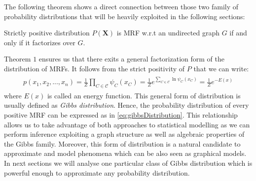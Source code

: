\documentclass[../report/report.tex]{subfiles}
\begin{document}
The following theorem shows a direct connection between those two family of probability distributions that will be heavily exploited in the following sections:
\begin{theorem}  Strictly positive distribution $P(\mathbf{X})$ is MRF  w.r.t an undirected graph $G$ if and only if it factorizes over $G$.
\end{theorem}
Theorem $1$ ensures us that there exits a general factorization form of the distribution of MRFs. It follows from the strict positivity of $P$ that we can write:
\begin{align}
\begin{split}
p(x_1, x_2, ..., x_n) = \frac{1}{Z} \prod_{C \in \mathcal{C}} \psi
_C(x_C) = \frac{1}{Z} e ^{\sum_{C \in \mathcal{C}} \ln \psi
_C(x_C) } = \frac{1}{Z} e ^{-E(x)}
\end{split}
\label{eq:gibbsDistribution}
\end{align}
where $E(x)$ is called an energy function. This general form of distribution is usually defined as \emph{Gibbs distribution}. Hence, the probability distribution of every positive MRF can be expressed as in \ref{eq:gibbsDistribution}. 
This relationship allows us to take advantage of both approaches to statistical modelling as we can perform inference exploiting a graph structure as well as algebraic properties of the Gibbs family. Moreover, this form of distribution is a natural candidate to approximate and model phenomena which can be also seen as graphical models. In next sections we will analyse one particular class of Gibbs distribution which is powerful enough to approximate any probability distribution.
\end{document}
